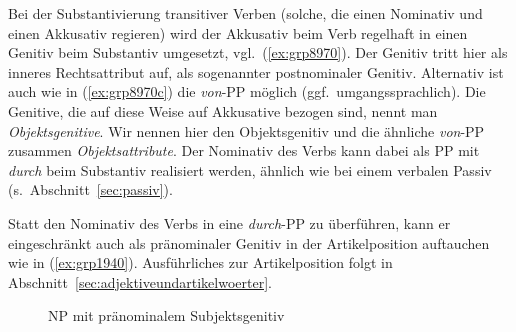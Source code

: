 
Bei der Substantivierung transitiver Verben (solche, die einen Nominativ und einen Akkusativ regieren) wird der Akkusativ beim Verb regelhaft in einen Genitiv beim Substantiv umgesetzt, vgl.\ (\ref{ex:grp8970}).
Der Genitiv tritt hier als inneres Rechtsattribut auf, als sogenannter postnominaler Genitiv.
Alternativ ist auch wie in (\ref{ex:grp8970c}) die \textit{von}-PP möglich (ggf.\ umgangssprachlich).
Die Genitive, die auf diese Weise auf Akkusative bezogen sind, nennt man \textit{Objektsgenitive}.
Wir nennen hier den Objektsgenitiv und die ähnliche \textit{von}-PP zusammen \textit{Objektsattribute}.
Der Nominativ des Verbs kann dabei als PP mit \textit{durch} beim Substantiv realisiert werden, ähnlich wie bei einem verbalen Passiv (s.\ Abschnitt~\ref{sec:passiv}).

\begin{exe}
  \ex\label{ex:grp8970}
  \begin{xlist}
  \end{xlist}
\end{exe}


Statt den Nominativ des Verbs in eine \textit{durch}-PP zu überführen, kann er eingeschränkt auch als pränominaler Genitiv in der Artikelposition auftauchen wie in (\ref{ex:grp1940}).
Ausführliches zur Artikelposition folgt in Abschnitt~\ref{sec:adjektiveundartikelwoerter}.

\begin{exe}
  \ex\label{ex:grp1940}
  \begin{xlist}
  \end{xlist}
\end{exe}

\begin{figure}
  \centering
  \caption{NP mit pränominalem Subjektsgenitiv}
  \label{fig:grp1940b}
\end{figure}

